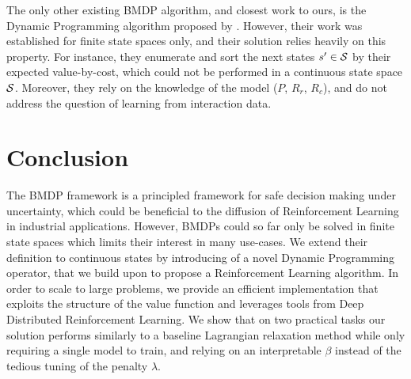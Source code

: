 The only other existing BMDP algorithm, and closest work to ours, is the Dynamic Programming algorithm proposed by \citet{Boutilier_Lu:uai16}. However, their work was established for finite state spaces only, and their solution relies heavily on this property. For instance, they enumerate and sort the next states $s'\in\mathcal{S}$ by their expected value-by-cost, which could not be performed in a continuous state space $\mathcal{S}$. Moreover, they rely on the knowledge of the model ($P$, $R_r$, $R_c$), and do not address the question of learning from interaction data.

\section*{Conclusion}
\label{sec:conclusion}
The BMDP framework is a principled framework for safe decision making under uncertainty, which could be beneficial to the diffusion of Reinforcement Learning in industrial applications. However, BMDPs could so far only be solved in finite state spaces which limits their interest in many use-cases. We extend their definition to continuous states by introducing of a novel Dynamic Programming operator, that we build upon to propose a Reinforcement Learning algorithm. In order to scale to large problems, we provide an efficient implementation that exploits the structure of the value function and leverages tools from Deep Distributed Reinforcement Learning. We show that on two practical tasks our solution performs similarly to a baseline Lagrangian relaxation method while only requiring a single model to train, and relying on an interpretable $\beta$ instead of the tedious tuning of the penalty $\lambda$.




